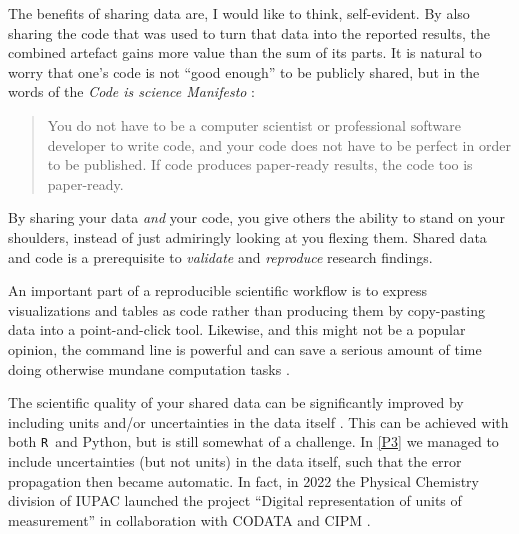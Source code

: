 \documentclass[webedition,openright,titles,swedish,english]{LuaUUThesis}\usepackage[]{graphicx}\usepackage[]{xcolor}
\newcommand{\R}{\texttt{R}}
\begin{document}
The benefits of sharing data are, I would like to think, self-evident.
By also sharing the code that was used to turn that data into the reported results,
the combined artefact gains more value than the sum of its parts.
It is natural to worry that one's code is not \enquote{good enough} to be publicly shared,
but in the words of the \emph{Code is science Manifesto} \cite{Yehudi2019}:
\blockquote{%
   You do not have to be a computer scientist or professional software developer
   to write code, and your code does not have to be perfect in order to be published.
   If code produces paper-ready results, the code too is paper-ready.}
By sharing your data \emph{and} your code, you give others the ability
to stand on your shoulders, instead of just admiringly looking at you flexing them.
Shared data and code is a prerequisite to \emph{validate} and \emph{reproduce}
research findings.

An important part of a reproducible scientific workflow is to
express visualizations and tables as code rather than producing them by copy-pasting
data into a point-and-click tool.
Likewise, and this might not be a popular opinion, the command line is powerful
and can save a serious amount of time doing otherwise mundane computation tasks \cite{Perkel2021}.

The scientific quality of your shared data can be significantly improved by
including units and/or uncertainties in the data itself \cite{Hanisch2022}.
This can be achieved with both \R\ and Python, but is still somewhat of a challenge.
In \cref{P3} we managed to include uncertainties (but not units) in the data
itself, such that the error propagation then became automatic.
In fact, in 2022 the Physical Chemistry division of IUPAC launched the project
\enquote{Digital representation of units of measurement} in collaboration
with CODATA and CIPM \cite{Frey2020,CODATA2020}.
\end{document}
